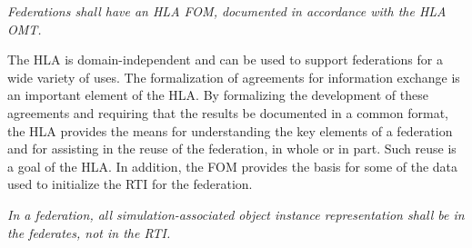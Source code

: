 
\newpage
\begingroup
\addtolength{\topskip}{1.4pt}
\vspace{-6.9pt}
\vspace{-7.4pt}
\vspace{-8.0pt}
\vspace{-2.3pt}


\textit{Federations shall have an HLA FOM, documented in accordance with the HLA OMT.}

\vspace{6.1pt}
The HLA is domain-independent and can be used to support federations for a wide variety of uses. The\linebreak
formalization of agreements for information exchange is an important element of the HLA. By formalizing\linebreak
the development of these agreements and requiring that the results be documented in a common format, the\linebreak
HLA provides the means for understanding the key elements of a federation and for assisting in the reuse of\linebreak
the federation, in whole or in part. Such reuse is a goal of the HLA. In addition, the FOM provides the basis\linebreak
for some of the data used to initialize the RTI for the federation.

\vspace{4.5pt}

\textit{In a federation, all simulation-associated object instance representation shall be in the federates, not in the\linebreak
RTI.}

